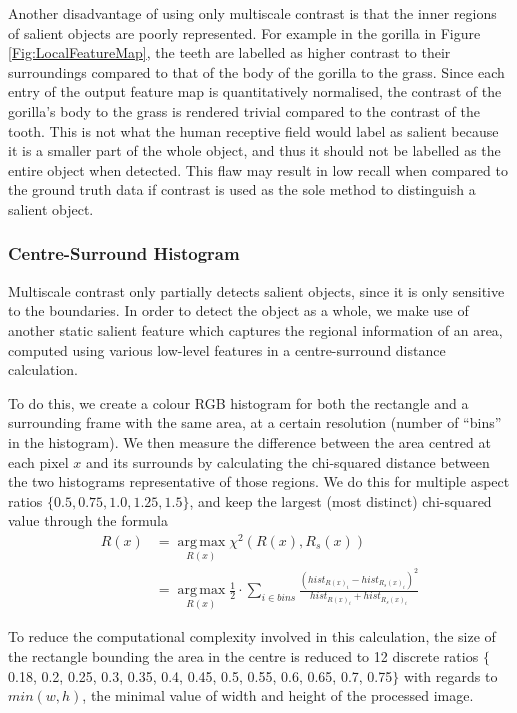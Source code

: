 \documentclass[10pt,twocolumn,letterpaper]{article}
\DeclareMathOperator*{\argmax}{arg\,max}
\newcommand{\SUM}{\sum\limits}
\begin{document}
Another disadvantage of using only multiscale contrast is that the inner regions of salient objects are poorly represented.  For example in the gorilla in Figure \ref{Fig:LocalFeatureMap}, the teeth are labelled as higher contrast to their surroundings compared to that of the body of the gorilla to the grass. Since each entry of the output feature map is quantitatively normalised, the contrast of the gorilla's body to the grass is rendered trivial compared to the contrast of the tooth. This is not what the human receptive field would label as salient because it is a smaller part of the whole object, and thus it should not be labelled as the entire object when detected. This flaw may result in low recall when compared to the ground truth data if contrast is used as the sole method to distinguish a salient object.

\subsubsection{Centre-Surround Histogram}

Multiscale contrast only partially detects salient objects, since it is only sensitive to the boundaries. In order to detect the object as a whole, we make use of another static salient feature which captures the regional information of an area, computed using various low-level features in a centre-surround distance calculation. 

To do this, we create a colour RGB histogram for both the rectangle and a surrounding frame with the same area, at a certain resolution (number of ``bins'' in the histogram). We then measure the difference between the area centred at each pixel $x$ and its surrounds by calculating the chi-squared distance between the two histograms representative of those regions.  We do this for multiple aspect ratios $\{ 0.5, 0.75, 1.0, 1.25, 1.5\}$, and keep the largest (most distinct) chi-squared value through the formula
\begin{align*}
R(x) &= \argmax\limits_{R(x)}\chi^2(R(x), R_s(x)) \\ &=\argmax\limits_{R(x)}\frac{1}{2}\cdot\SUM_{i\in bins}\frac{(hist_{R(x)_i}-hist_{R_s(x)_i})^2}{hist_{R(x)_i}+hist_{R_s(x)_i}}
\end{align*}

To reduce the computational complexity involved in this calculation, the size of the rectangle bounding the area in the centre is reduced to 12 discrete ratios $\{$0.18, 0.2, 0.25, 0.3, 0.35, 0.4, 0.45, 0.5, 0.55, 0.6, 0.65, 0.7, 0.75$\}$ with regards to  $min(w,h)$, the minimal value of width and height of the processed image.
\end{document}
